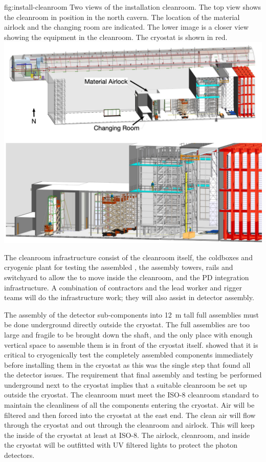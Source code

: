 \begin{dunefigure}{fig:install-cleanroom}
  {Two views of the installation cleanroom.  The top view shows the cleanroom in position in the north cavern. The location of the material airlock and the changing room are indicated. The lower image is a closer view showing the equipment in the cleanroom. The cryostat is shown in red.
  } 
\includegraphics[width=1.0\textwidth]{graphics/install-cleanroom.jpg}
\end{dunefigure}

The cleanroom infrastructure consist of the cleanroom itself, the coldboxes and cryogenic plant for testing the assembled , the assembly towers, rails and switchyard to allow the  to move inside the cleanroom, and the PD integration infrastructure. A combination of contractors and the lead worker and rigger teams will do the infrastructure work; they will also assist in detector assembly. 

The assembly of the detector sub-components into \SI{12}{m} tall full assemblies must be done underground directly outside the cryostat. 
The full assemblies are too large and fragile to be brought down the shaft, and the only place with enough vertical space to assemble them is in front of the cryostat itself. 
 showed that it is critical to cryogenically test the completely assembled components immediately before installing them in the cryostat as this was the single step that found all the detector issues. 
The requirement that final assembly and testing be performed underground next to the cryostat implies that a suitable cleanroom be set up outside the cryostat. 
The cleanroom must meet the ISO-8 cleanroom standard to maintain the cleanliness of all the components entering the cryostat.  
Air will be filtered and then forced into the cryostat at the east end. The clean air will flow through the cryostat and out through the cleanroom and airlock. 
This will keep the inside of the cryostat at least at ISO-8.  
The airlock, cleanroom, and inside the cryostat will be outfitted with UV filtered lights to protect the photon detectors.

